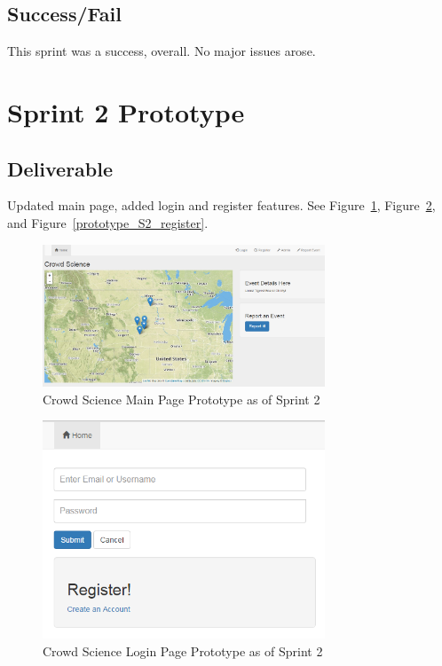 \subsection{Success/Fail}
This sprint was a success, overall. No major issues arose.

\section{Sprint 2 Prototype}
\subsection{Deliverable}
Updated main page, added login and register features. See Figure~\ref{prototype_S2_main}, Figure~\ref{prototype_S2_login}, and Figure~\ref{prototype_S2_register}.

\begin{figure}[tbh]
\begin{center}
\includegraphics[width=0.75\textwidth]{./figures/prototype_S2_main.png}
\end{center}
\caption{Crowd Science Main Page Prototype as of Sprint 2\label{prototype_S2_main}}
\end{figure}

\begin{figure}[tbh]
\begin{center}
\includegraphics[width=0.75\textwidth]{./figures/prototype_S2_login.png}
\end{center}
\caption{Crowd Science Login Page Prototype as of Sprint 2\label{prototype_S2_login}}
\end{figure}

